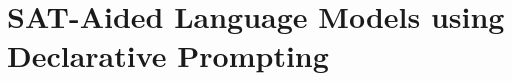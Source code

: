 \documentclass{article}
\theoremstyle{definition}
\newcommand\gd[1]{\todo[color=red!40]{{\bf Greg}: #1}}
\newcommand{\pallm}{\textsc{ProgLM}}
\begin{document}





\section{SAT-Aided Language Models using Declarative Prompting}


\end{document}
